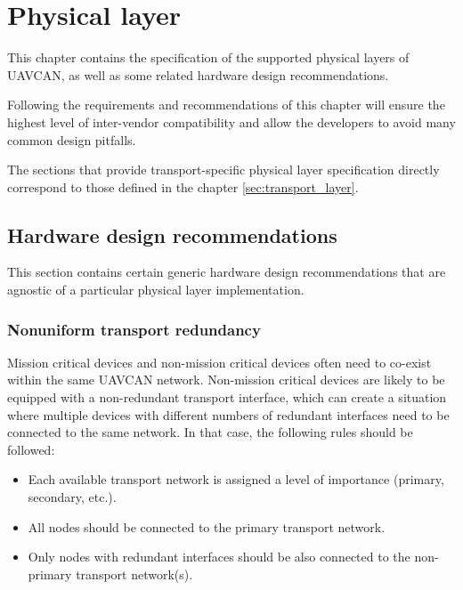 \chapter{Physical layer}\label{sec:physical_layer}

This chapter contains the specification of the supported physical layers of UAVCAN,
as well as some related hardware design recommendations.

Following the requirements and recommendations of this chapter will ensure the highest level of
inter-vendor compatibility and allow the developers to avoid many common design pitfalls.

The sections that provide transport-specific physical layer specification
directly correspond to those defined in the chapter \ref{sec:transport_layer}.

\clearpage

\clearpage
\section{Hardware design recommendations}

This section contains certain generic hardware design recommendations that are agnostic of a particular
physical layer implementation.

\subsection{Nonuniform transport redundancy}\label{sec:phy_nonuniform_transport_redundancy}

Mission critical devices and non-mission critical devices often need to co-exist within the same UAVCAN network.
Non-mission critical devices are likely to be equipped with a non-redundant transport interface,
which can create a situation where multiple devices with different numbers of redundant interfaces
need to be connected to the same network.
In that case, the following rules should be followed:

\begin{itemize}
    \item Each available transport network is assigned a level of importance (primary, secondary, etc.).
    \item All nodes should be connected to the primary transport network.
    \item Only nodes with redundant interfaces should be also connected to the non-primary transport network(s).
\end{itemize}

